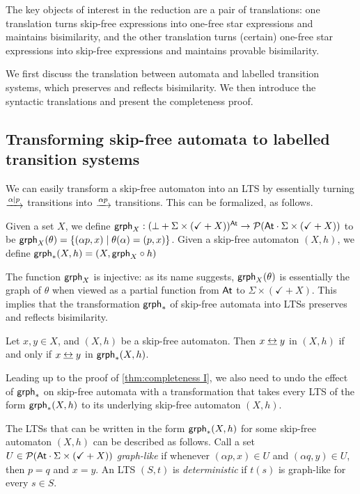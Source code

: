 \documentclass[orivec,envcountsect,envcountsame]{llncs}
\begin{document}
The key objects of interest in the reduction are a pair of translations: one translation turns skip-free  \GKAT expressions into one-free star expressions and maintains bisimilarity, and the other translation turns (certain) one-free star expressions into skip-free  \GKAT expressions and maintains provable bisimilarity.

We first discuss the translation between automata and labelled transition systems, which preserves and reflects bisimilarity.
 We then introduce the syntactic translations and present the completeness proof.

\subsection{Transforming skip-free automata to labelled transition systems}
We can easily transform a skip-free automaton into an LTS by essentially turning \(\tr{\alpha \mid p}\) transitions into \(\tr{\alpha p}\) transitions. This can be formalized, as follows.

\begin{definition}
    Given a set \(X\), we define \(\mathsf{grph}_X : (\bot + \Sigma\times(\checkmark + X))^{\mathsf{At}} \to \mathcal P(\mathsf{At}\cdot\Sigma \times (\checkmark + X)) \) to be
    \(
        \mathsf{grph}_X(\theta) = \{(\alpha p, x) \mid \theta(\alpha) = (p, x)\}
    \).
    Given a skip-free automaton \((X, h)\), we define \(\mathsf{grph}_*(X, h) = {(X, \mathsf{grph}_X \circ h)}\)
\end{definition}

The function \(\mathsf{grph}_X\) is injective: as its name suggests, \(\mathsf{grph}_X(\theta)\) is essentially the graph of $\theta$ when viewed as a partial function from $\mathsf{At}$ to ${\Sigma \times (\checkmark + X)}$.
This implies that the transformation \(\mathsf{grph}_*\) of skip-free automata into LTSs preserves and reflects bisimilarity.

\begin{lemma}\label{lem:bisim iff bisim}
    Let \(x, y \in X\), and \((X, h)\) be a skip-free automaton.
    Then \(x \bisim y\) in \((X, h)\) if and only if \(x \bisim y\) in \(\mathsf{grph}_*(X, h)\).
\end{lemma}

Leading up to the proof of \cref{thm:completeness I}, we also need to undo the effect of \(\mathsf{grph}_*\) on skip-free automata with a transformation that takes every LTS of the form \(\mathsf{grph}_*(X, h)\) to its underlying skip-free automaton \((X, h)\).

The LTSs that can be written in the form \(\mathsf{grph}_*(X, h)\) for some skip-free automaton \((X, h)\) can be described as follows.
Call a set \(U \in  \mathcal{P}(\mathsf{At} \cdot \Sigma \times (\checkmark + X))\) \emph{graph-like} if whenever \((\alpha p, x)\in U\) and \((\alpha q, y) \in U\), then \(p = q\) and \(x = y\).
An LTS \((S, t)\) is \emph{deterministic} if \(t(s)\) is graph-like for every \(s \in S\).
\end{document}
